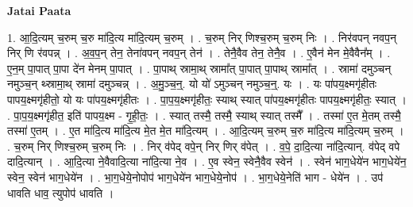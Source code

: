 \documentclass[17pt]{extarticle}
\begin{document}
\textbf{Jatai Paata} \newline

1. आ॒दि॒त्यम् च॒रुम् च॒रु मा॑दि॒त्य मा॑दि॒त्यम् च॒रुम् । . च॒रुम् निर् णिश्च॒रुम् च॒रुम् निः । . निर॑वपन् नवप॒न् निर् णि र॑वपन्न् । . अ॒व॒प॒न् तेन॒ तेना॑वपन् नवप॒न् तेन॑ । . तेनै॒वैव तेन॒ तेनै॒व । . ए॒वैन॑ मेन मे॒वैवैन᳚म् । . ए॒न॒म् पा॒पात् पा॒पा दे॑न मेनम् पा॒पात् । . पा॒पाथ् स्रामा॒थ् स्रामा᳚त् पा॒पात् पा॒पाथ् स्रामा᳚त् । . स्रामा॑ दमुञ्चन् नमुञ्च॒न् थ्स्रामा॒थ् स्रामा॑ दमुञ्चन्न् । . अ॒मु॒ञ्च॒न्॒. यो यो॑ ऽमुञ्चन् नमुञ्च॒न्॒. यः । . यः पा॑पय॒क्ष्मगृ॑हीतः पापय॒क्ष्मगृ॑हीतो॒ यो यः पा॑पय॒क्ष्मगृ॑हीतः । . पा॒प॒य॒क्ष्मगृ॑हीतः॒ स्याथ् स्यात् पा॑पय॒क्ष्मगृ॑हीतः पापय॒क्ष्मगृ॑हीतः॒ स्यात् । . पा॒प॒य॒क्ष्मगृ॑हीत॒ इति॑ पापय॒क्ष्म - गृ॒ही॒तः॒ । . स्यात् तस्मै॒ तस्मै॒ स्याथ् स्यात् तस्मै᳚ । . तस्मा॑ ए॒त मे॒तम् तस्मै॒ तस्मा॑ ए॒तम् । . ए॒त मा॑दि॒त्य मा॑दि॒त्य मे॒त मे॒त मा॑दि॒त्यम् । . आ॒दि॒त्यम् च॒रुम् च॒रु मा॑दि॒त्य मा॑दि॒त्यम् च॒रुम् । . च॒रुम् निर् णिश्च॒रुम् च॒रुम् निः । . निर् व॑पेद् वपे॒न् निर् णिर् व॑पेत् । . व॒पे॒ दा॒दि॒त्या ना॑दि॒त्यान्. व॑पेद् वपे दादि॒त्यान् । . आ॒दि॒त्या ने॒वैवादि॒त्या ना॑दि॒त्या ने॒व । . ए॒व स्वेन॒ स्वेनै॒वैव स्वेन॑ । . स्वेन॑ भाग॒धेये॑न भाग॒धेये॑न॒ स्वेन॒ स्वेन॑ भाग॒धेये॑न । . भा॒ग॒धेये॒नोपोप॑ भाग॒धेये॑न भाग॒धेये॒नोप॑ । . भा॒ग॒धेये॒नेति॑ भाग - धेये॑न । . उप॑ धावति धाव॒ त्युपोप॑ धावति । \newline
\end{document}
